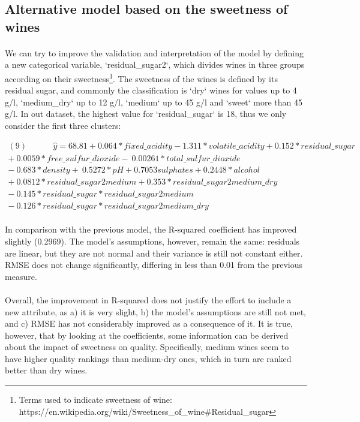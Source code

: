 \documentclass[10pt]{article}
\begin{document}
\subsection{Alternative model based on the sweetness of wines}

\paragraph*{}
We can try to improve the validation and interpretation of the model by defining a new categorical variable, `residual\_sugar2`, which divides wines in three groups according on their sweetness\footnote{Terms used to indicate sweetness of wine: https://en.wikipedia.org/wiki/Sweetness\_of\_wine\#Residual\_sugar}. The sweetness of the wines is defined by its residual sugar, and commonly the classification is `dry` wines for values up to 4 g/l, `medium\_dry` up to 12 g/l,  `medium` up to 45 g/l and `sweet` more than 45 g/l. In out dataset, the highest value for `residual\_sugar` is 18, thus we only consider the first three clusters:

\begin{equation*}
\begin{aligned}	
(9) \ \ \ \  \ \ \ \ \ \ \ \ \ \  \hat{y} = 68.81 + 0.064*fixed\_acidity  -1.311*volatile\_acidity 
+0.152*residual\_sugar \\
+ \  0.0059*free\_sulfur\_dioxide  - \ 0.00261*total\_sulfur\_dioxide   
\\ - \ 0.683*density  + \ 0.5272*pH   + 0.7053sulphates + 0.2448*alcohol \\
+ \ 0.0812 * residual\_sugar2medium + 0.353 * residual\_sugar2medium\_dry \\
- \ 0.145 * residual\_sugar*residual\_sugar2medium \\
- \ 0.126 * residual\_sugar*residual\_sugar2medium\_dry
\end{aligned}
\end{equation*}


\paragraph*{}
In comparison with the previous model, the R-squared coefficient has improved slightly (0.2969). The model's assumptions, however, remain the same: residuals are linear, but they are not normal and their variance is still not constant either. RMSE does not change significantly, differing in less than 0.01 from the previous measure. 

\paragraph*{}
Overall, the improvement in R-squared does not justify the effort to include a new attribute, as a) it is very slight, b) the model's assumptions are still not met, and c) RMSE has not considerably improved as a consequence of it. It is true, however, that by looking at the coefficients, some information can be derived about the impact of sweetness on quality. Specifically, medium wines seem to have higher quality rankings than medium-dry ones, which in turn are ranked better than dry wines. 
\end{document}
